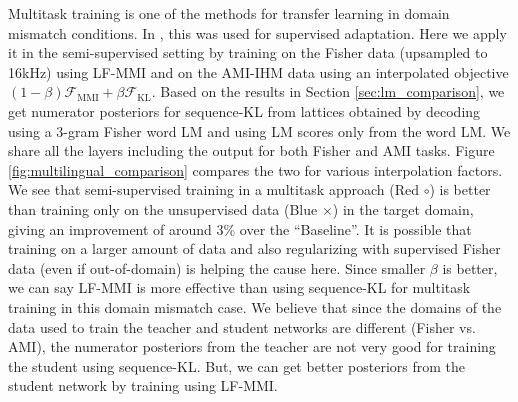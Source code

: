 \documentclass{article}
\newcommand{\Fkl}{\mathcal{F}_\text{KL}}
\newcommand{\Fmmi}{\mathcal{F}_\text{MMI}}
\begin{document}
Multitask training is one of the methods for transfer learning in domain
mismatch conditions. In 
\cite{pegah2017transfer}, this was used for supervised adaptation. 
Here we apply it in the semi-supervised setting by
training on the Fisher data (upsampled to 16kHz) using LF-MMI and 
on the AMI-IHM data using an interpolated objective 
$(1-\beta)\Fmmi+\beta\Fkl$. Based on the results in Section
\ref{sec:lm_comparison}, we get numerator posteriors for sequence-KL 
from lattices obtained by decoding using a 3-gram Fisher word LM and 
using LM scores only from the word LM.
We share all the layers including the output for both Fisher and AMI tasks.
Figure \ref{fig:multilingual_comparison} compares the two for various
interpolation factors. We see that semi-supervised training in a
multitask approach (Red $\circ$) is better than training 
only on the unsupervised data (Blue $\times$) in the target domain, 
giving an improvement of around 3\% over
the ``Baseline''.  It is possible that training on a larger amount of data and
also regularizing with supervised Fisher data (even if out-of-domain) is helping
the cause here.  Since smaller $\beta$ is better, we can say LF-MMI is more
effective than using sequence-KL for multitask training in this domain mismatch
case. We believe that since the domains of the data used to train the teacher
and student networks are different (Fisher vs. AMI), the numerator posteriors
from the teacher are not very good for training the student using sequence-KL.
But, we can get better posteriors from the student network by training using
LF-MMI.

\end{document}
